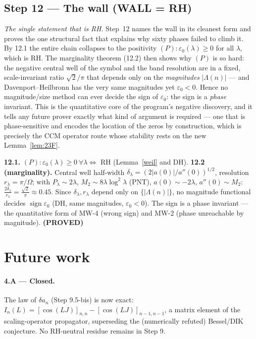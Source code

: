 \documentclass[11pt]{amsart}
\theoremstyle{definition}
\theoremstyle{remark}
\newcommand{\ve}{\varepsilon}
\newcommand{\PROVED}{\textbf{(PROVED)}}
\newcommand{\WALL}{\textbf{(WALL = RH)}}
\begin{document}
\subsection{Step 12 --- The wall \WALL}

\emph{The single statement that is RH.} Step~12 names the wall in its cleanest form and proves
the one structural fact that explains why sixty phases failed to climb it. By 12.1 the entire
chain collapses to the positivity $(P):\ve_0(\lambda)\ge0$ for all $\lambda$, which is RH. The
marginality theorem (12.2) then shows why $(P)$ is so hard: the negative central well of the
symbol and the band resolution are in a fixed, scale-invariant ratio $\sqrt2/\pi$ that depends
only on the \emph{magnitudes} $|\Lambda(n)|$ --- and Davenport--Heilbronn has the very same
magnitudes yet $\ve_0<0$. Hence no magnitude/size method can ever decide the sign of $\ve_0$:
the sign is a \emph{phase} invariant. This is the quantitative core of the program's negative
discovery, and it tells any future prover exactly what kind of argument is required --- one that
is phase-sensitive and encodes the location of the zeros by construction, which is precisely the
CCM operator route whose stability rests on the new Lemma~\ref{lem:23F}.

\textbf{12.1.} $(P):\ve_0(\lambda)\ge0\ \forall\lambda\iff$ RH (Lemma~\ref{weil} and DH).
\textbf{12.2 (marginality).} Central well half-width $\delta_\lambda=(2|a(0)|/a''(0))^{1/2}$,
resolution $r_\lambda=\pi/\Omega$; with $P_\lambda\sim2\lambda$,
$M_2\sim8\lambda\log^2\lambda$ (PNT), $a(0)\sim-2\lambda$, $a''(0)\sim M_2$:
$\frac{2\delta_\lambda}{r_\lambda}=\frac{\sqrt2}{\pi}\approx0.45$. Since $\delta_\lambda,r_\lambda$
depend only on $\{|\Lambda(n)|\}$, no magnitude functional decides $\operatorname{sign}\ve_0$ (DH,
same magnitudes, $\ve_0<0$). The sign is a phase invariant --- the quantitative form of MW-4
(wrong sign) and MW-2 (phase unreachable by magnitude). \PROVED

\section{Future work}
\paragraph{4.A --- Closed.} The law of $\delta a_n$ (Step 9.5-bis) is now exact:
$I_n(L)=[\cos(LJ)]_{n,n}-[\cos(LJ)]_{n-1,n-1}$, a matrix element of the scaling-operator
propagator, superseding the (numerically refuted) Bessel/DIK conjecture. No RH-neutral residue
remains in Step 9.
\end{document}
